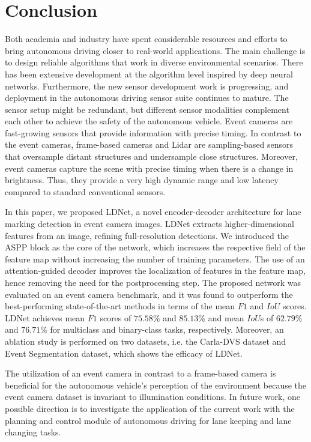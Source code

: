 \documentclass[journal]{IEEEtran}
\begin{document}
\section{Conclusion}
Both academia and industry have spent considerable resources and efforts to bring autonomous driving closer to real-world applications. The main challenge is to design reliable algorithms that work in diverse environmental scenarios. There has been extensive development at the algorithm level inspired by deep neural networks. Furthermore, the new sensor development work is progressing, and deployment in the autonomous driving sensor suite continues to mature. The sensor setup might be redundant, but different sensor modalities complement each other to achieve the safety of the autonomous vehicle. Event cameras are fast-growing sensors that provide information with precise timing. In contrast to the event cameras, frame-based cameras and Lidar are sampling-based sensors that oversample distant structures and undersample close structures. Moreover, event cameras capture the scene with precise timing when there is a change in brightness. Thus, they provide a very high dynamic range and low latency compared to standard conventional sensors. 
\par
In this paper, we proposed LDNet, a novel encoder-decoder architecture for lane marking detection in event camera images. LDNet extracts higher-dimensional features from an image, refining full-resolution detections. We introduced the ASPP block as the core of the network, which increases the respective field of the feature map without increasing the number of training parameters. The use of an attention-guided decoder improves the localization of features in the feature map, hence removing the need for the postprocessing step. The proposed network was evaluated on an event camera benchmark, and it was found to outperform the best-performing state-of-the-art methods in terms of the mean $F1$ and $IoU$ scores. LDNet achieves mean $F1$ scores of $75.58\%$ and $85.13\%$ and mean $IoU$s of $62.79\%$ and $76.71 \%$ for multiclass and binary-class tasks, respectively. Moreover, an ablation study is performed on two datasets, i.e. the Carla-DVS dataset and Event Segmentation dataset, which shows the efficacy of LDNet.
\par
The utilization of an event camera in contrast to a frame-based camera is beneficial for the autonomous vehicle's perception of the environment because the event camera dataset is invariant to illumination conditions. In future work, one possible direction is to investigate the application of the current work with the planning and control module of autonomous driving \cite{swn}\cite{sa} for lane keeping and lane changing tasks.
\end{document}
